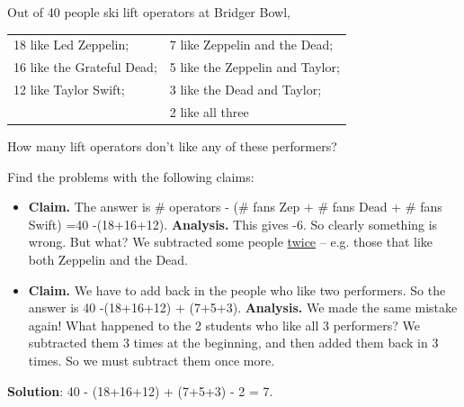 \documentclass[10pt]{beamer}
\begin{document}
\begin{frame}
\footnotesize 
    
\begin{mygreenbox}[title=The ski lift operator is absolutely vibing]
Out of 40 people ski lift operators at Bridger Bowl,
	\begin{tabular}{p{} p{}}
	18 like Led Zeppelin; & 7 like Zeppelin and the Dead;\\
	16 like the Grateful Dead; & 5 like the Zeppelin and Taylor; \\
	12 like Taylor Swift; & 3 like the Dead and Taylor; \\
	& 2 like all three\\
	\end{tabular}
How many lift operators don't like any of these performers?
\end{mygreenbox}
\vfill
\begin{myyellowbox}[title=Poll]
Find the problems with the following claims:

\begin{itemize}
	\item \textbf{Claim.} The answer is \# operators - (\# fans Zep + \# fans Dead + \# fans Swift) =40 -(18+16+12).  \pause \textbf{Analysis.}  This gives -6.  So clearly something is wrong.  But what? \pause We subtracted some people \underline{twice} -- e.g. those that like both Zeppelin and the Dead.
	\item  \textbf{Claim.} We have to add back in the people who like two performers. So the answer is  40 -(18+16+12) + (7+5+3). \pause  \textbf{Analysis.} We made the same mistake again! What happened to the 2 students who like all 3 performers?  We subtracted them 3 times at the beginning, and then added them back in 3 times.  So we must subtract them once more. \pause 
\end{itemize}
\end{myyellowbox}
\vfill 
\textbf{Solution}: 40 - (18+16+12) + (7+5+3) - 2 = 7.
\end{frame}
\end{document}
